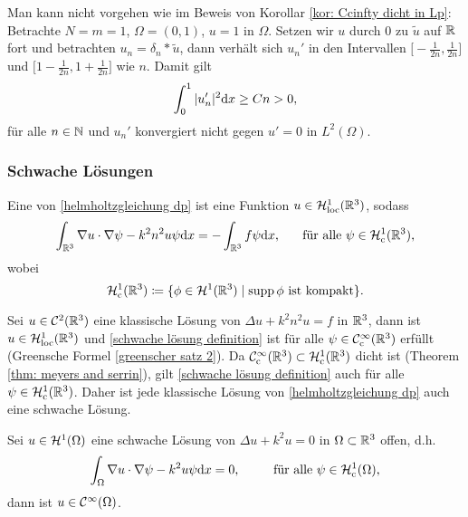 \begin{bem}
	Man kann nicht vorgehen wie im Beweis von Korollar \ref{kor: Ccinfty dicht in Lp}: Betrachte \(N=m=1\), \(\Omega=(0,1)\), \(u=1\) in \(\Omega\). Setzen wir \(u\) durch \(0\) zu \(\widetilde{u}\) auf \(\mathbb{R}\) fort und betrachten \(u_n=\delta_n\ast\widetilde{u}\), dann verhält sich \(u_n'\) in den Intervallen \(\big[-\frac{1}{2n},\frac{1}{2n}\big]\) und \(\big[1-\frac{1}{2n},1+\frac{1}{2n}\big]\) wie \(n\). Damit gilt
	\begin{equation*}
		\int_0^1|u_n'|^2\mathrm{d}x\geq Cn>0,
	\end{equation*}
	für alle \(n\in\mathbb{N}\) und \(u_n'\) konvergiert nicht gegen \(u'=0\) in \(L^2(\Omega)\).
\end{bem}
\subsubsection*{Schwache Lösungen}
\begin{definition}\label{def: schwache lösung}
	Eine  von \eqref{helmholtzgleichung dp} ist eine Funktion \(u\in\mathcal{H}_{\mathrm{loc}}^1(\mathbb{R}^3)\), sodass 
	\begin{equation}
		\label{schwache lösung definition}
		\int_{\mathbb{R}^3}\nabla u\cdot\nabla\psi-k^2n^2u\psi\mathrm{d}x=-\int_{\mathbb{R}^3}f\psi\mathrm{d}x,\;\;\;\;\;\text{ für alle }\psi\in\mathcal{H}_{\mathrm{c}}^1(\mathbb{R}^3),
	\end{equation}
	wobei
	\begin{equation*}
		\mathcal{H}_{\mathrm{c}}^1(\mathbb{R}^3)\coloneqq\{\phi\in\mathcal{H}^1(\mathbb{R}^3)\mid\operatorname{supp}\phi\text{ ist kompakt}\}.
	\end{equation*}
\end{definition}
\begin{counter bem}
	Sei \(u\in\mathcal{C}^2(\mathbb{R}^3)\) eine klassische Lösung von \(\Delta u+k^2n^2u=f\) in \(\mathbb{R}^3\), dann ist \(u\in\mathcal{H}_{\mathrm{loc}}^1(\mathbb{R}^3)\) und \eqref{schwache lösung definition} ist für alle \(\psi\in\mathcal{C}_{\mathrm{c}}^\infty(\mathbb{R}^3)\) erfüllt (Greensche Formel \eqref{greenscher satz 2}). Da \(\mathcal{C}_{\mathrm{c}}^\infty(\mathbb{R}^3)\subset\mathcal{H}_{\mathrm{c}}^1(\mathbb{R}^3)\) dicht ist (Theorem \ref{thm: meyers and serrin}), gilt \eqref{schwache lösung definition} auch für alle \(\psi\in\mathcal{H}_{\mathrm{c}}^1(\mathbb{R}^3)\). Daher ist jede klassische Lösung von \eqref{helmholtzgleichung dp} auch eine schwache Lösung.
\end{counter bem}
\begin{thm}\label{thm: regularität}
	Sei \(u\in\mathcal{H}^1(\Omega)\) eine schwache Lösung von \(\Delta u+k^2u=0\) in \(\Omega\subset\mathbb{R}^3\) offen, d.h.
	\begin{equation*}
		\int_\Omega\nabla u\cdot\nabla\psi-k^2u\psi\mathrm{d}x=0,\;\qquad\text{ für alle }\psi\in\mathcal{H}_{\mathrm{c}}^1(\Omega),
	\end{equation*}
	dann ist \(u\in\mathcal{C}^\infty(\Omega)\).
\end{thm}
